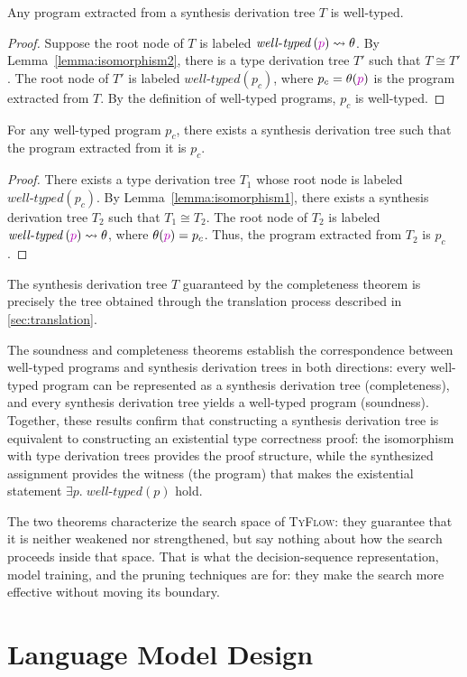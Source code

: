\documentclass[manuscript,screen]{acmart}
\newcommand{\sk}[1]{\textcolor{skunknown}{#1}}
\newcommand{\welltyped}[1]{\mathit{well\text{-}typed}\left(#1\right)}
\newcommand{\toolname}[1]{\textsc{#1}}
\newcommand{\mainname}{\toolname{TyFlow}\xspace}
\begin{document}
\begin{theorem}[Soundness]
Any program extracted from a synthesis derivation tree $T$ is well-typed.
\end{theorem}
\begin{proof}
Suppose the root node of $T$ is labeled $\welltyped{\sk{p}} \leadsto \theta$. By Lemma~\ref{lemma:isomorphism2}, there is a type derivation tree $T'$ such that $T \cong T'$. The root node of $T'$ is labeled $\welltyped{p_c}$, where $p_c = \theta(\sk{p})$ is the program extracted from $T$. By the definition of well-typed programs, $p_c$ is well-typed.
\end{proof}

\begin{theorem}[Completeness]
For any well-typed program $p_c$, there exists a synthesis derivation tree such that the program extracted from it is $p_c$.
\end{theorem}
\begin{proof}
There exists a type derivation tree $T_1$ whose root node is labeled $\welltyped{p_c}$. By Lemma~\ref{lemma:isomorphism1}, there exists a synthesis derivation tree $T_2$ such that $T_1 \cong T_2$. The root node of $T_2$ is labeled $\welltyped{\sk{p}} \leadsto \theta$, where $\theta(\sk{p}) = p_c$. Thus, the program extracted from $T_2$ is $p_c$.
\end{proof}

\begin{corollary}
The synthesis derivation tree $T$ guaranteed by the completeness theorem is precisely the tree obtained through the translation process described in \autoref{sec:translation}.
\end{corollary}

The soundness and completeness theorems    {\color{revblue}establish } the correspondence between well-typed programs and synthesis derivation trees   in both directions: every well-typed program can be represented as a synthesis derivation tree (completeness), and every synthesis derivation tree yields a well-typed program (soundness). Together, these results confirm that constructing a synthesis derivation tree is equivalent to constructing an existential type correctness proof: the isomorphism with type derivation trees provides the proof structure, while the synthesized assignment provides the witness (the program) that makes the existential statement $\exists p.\; \welltyped{p}$ hold.
 

{\color{revblue}The two theorems characterize the search space of }\mainname{\color{revblue}: they guarantee that it is neither weakened nor strengthened, but say nothing about how the search proceeds inside that space.
That is what the decision-sequence representation, model training, and the pruning techniques are for: they make the search more effective without moving its boundary.
} \section{Language Model Design}
\label{sec:implementation}
\end{document}
